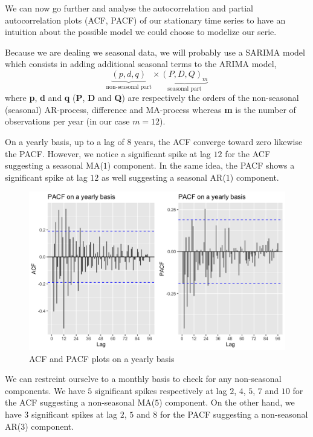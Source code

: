 We can now go further and analyse the autocorrelation and partial autocorrelation plots (ACF, PACF) of our stationary time series to have an intuition about the possible model we could choose to modelize our serie.

Because we are dealing we seasonal data, we will probably use a SARIMA model which consists in adding additional seasonal terms to the ARIMA model, 
\begin{equation}
	\underbrace{(p, d, q)}_{\text{non-seasonal part}} \times \underbrace{(P, D, Q)_m}_{\text{seasonal part}}
\end{equation} 
where \textbf{p}, \textbf{d} and \textbf{q} (\textbf{P}, \textbf{D} and \textbf{Q}) are respectively the orders of the non-seasonal (seasonal) AR-process, difference and MA-process whereas \textbf{m} is the number of observations per year (in our case $m = 12$).

On a yearly basis, up to a lag of $8$ years, the ACF converge toward zero likewise the PACF. However, we notice a significant spike at lag $12$ for the ACF suggesting a seasonal MA($1$) component. In the same idea, the PACF shows a significant spike at lag $12$ as well suggesting a seasonal AR($1$) component.

\begin{figure}[H]
	\centering
	\includegraphics{figures/box_jenkins/yearly_acf_pacf.png}
	\caption{ACF and PACF plots on a yearly basis}
	\label{fig:yearly-acf-pacf}
\end{figure}

We can restreint ourselve to a monthly basis to check for any non-seasonal components. We have $5$ significant spikes respectively at lag $2$, $4$, $5$, $7$ and $10$ for the ACF suggesting a non-seasonal MA($5$) component. On the other hand, we have $3$ significant spikes at lag $2$, $5$ and $8$ for the PACF suggesting a non-seasonal AR($3$) component. 

